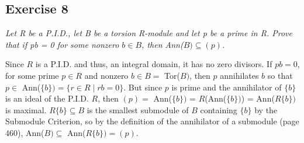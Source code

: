 \subsection*{Exercise 8}
\begin{framed}
\textit{Let R be a P.I.D., let B be a torsion R-module and let p be a prime in R. Prove that if pb = 0 for some nonzero $b \in B$, then Ann($B) \subseteq (p)$.}
\end{framed}

Since $R$ is a P.I.D. and thus, an integral domain, it has no zero divisors. If $pb = 0$, for some prime $p \in R$ and nonzero $b \in B =$ Tor($B)$, then $p$ annihilates $b$ so that $p \in$ Ann($\{b\}) = \{r \in R \mid rb = 0\}$. But since $p$ is prime and the annihilator of $\{b\}$ is an ideal of the P.I.D. $R$, then $(p) =$ Ann($\{b\})$ = $R$(Ann($\{b\})$) = Ann($R\{b\})$ is maximal. $R\{b\} \subseteq B$ is the smallest submodule of $B$ containing $\{b\}$ by the Submodule Criterion, so by the definition of the annihilator of a submodule (page 460), Ann($B) \subseteq$ Ann($R\{b\}) = (p)$.